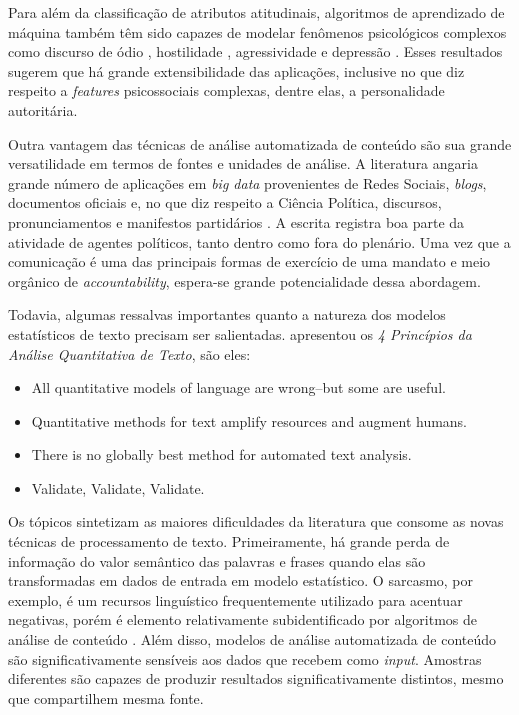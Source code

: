 \documentclass[
12pt,				%
openright,			%
twoside,			%
a4paper,			%
english,			%
french,				%
spanish,			%
brazil				%
]{abntex2}
\begin{document}
Para além da classificação de atributos atitudinais, algoritmos de aprendizado de máquina também têm sido capazes de modelar fenômenos psicológicos complexos como discurso de ódio \cite{davidson2017automated, zampieri2019predicting}, hostilidade \cite{hopp2017does, vargo2017socioeconomic, liu2018forecasting}, agressividade \cite{orasan2018aggressive, sahay2018detecting, nikhil2018lstms} e depressão \cite{mowery2016identifying, chekroud2016cross, orabi2018deep}. Esses resultados sugerem que há grande extensibilidade das aplicações, inclusive no que diz respeito a \emph{features} psicossociais complexas, dentre elas, a personalidade autoritária.

Outra vantagem das técnicas de análise automatizada de conteúdo são sua grande versatilidade em termos de fontes e unidades de análise. A literatura angaria grande número de aplicações em \emph{big data} provenientes de Redes Sociais, \emph{blogs}, documentos oficiais e, no que diz respeito a Ciência Política, discursos, pronunciamentos e manifestos partidários \cite{grimmer2013text, wilkerson2017large, gentzkow2019text}. A escrita registra boa parte da atividade de agentes políticos, tanto dentro como fora do plenário. Uma vez que a comunicação é uma das principais formas de exercício de uma mandato e meio orgânico de \emph{accountability}, espera-se grande potencialidade dessa abordagem.

Todavia, algumas ressalvas importantes quanto a natureza dos modelos estatísticos de texto precisam ser salientadas.  apresentou os \emph{4 Princípios da Análise Quantitativa de Texto}, são eles:

\begin{itemize}
	\item All quantitative models of language are wrong–but some are useful.
	\item Quantitative methods for text amplify resources and augment humans.
	\item There is no globally best method for automated text analysis.
	\item Validate, Validate, Validate.
\end{itemize}

Os tópicos sintetizam as maiores dificuldades da literatura que consome as novas técnicas de processamento de texto. Primeiramente, há grande perda de informação do valor semântico das palavras e frases quando elas são transformadas em dados de entrada em modelo estatístico. O sarcasmo, por exemplo, é um recursos linguístico frequentemente utilizado para acentuar negativas, porém é elemento relativamente subidentificado por algoritmos de análise de conteúdo \cite{maynard2014cares}. Além disso, modelos de análise automatizada de conteúdo são significativamente sensíveis aos dados que recebem como \emph{input}. Amostras diferentes são capazes de produzir resultados significativamente distintos, mesmo que compartilhem mesma fonte.  
\end{document}
